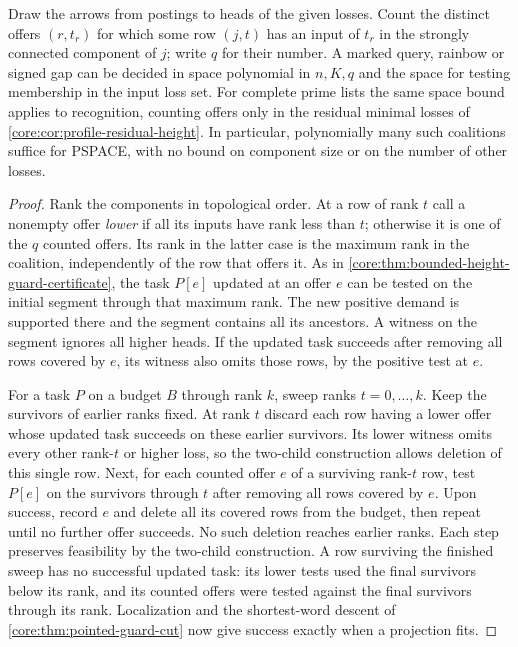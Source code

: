 \begin{theorem}
\label{core:thm:cyclic-coalition-space}
Draw the arrows from postings to heads of the given losses. Count
the distinct offers $(r,t_r)$ for which some row $(j,t)$ has an
input of $t_r$ in the strongly connected component of $j$; write
$q$ for their number. A marked query, rainbow or signed gap can be
decided in space polynomial in $n,K,q$ and the space for testing
membership in the input loss set. For complete prime lists the same
space bound applies to recognition, counting offers only in the
residual minimal losses of \cref{core:cor:profile-residual-height}.
In particular, polynomially many such coalitions suffice for PSPACE,
with no bound on component size or on the number of other losses.
\end{theorem}
\begin{proof}
Rank the components in topological order. At a row of rank $t$ call
a nonempty offer \emph{lower} if all its inputs have rank less than
$t$; otherwise it is one of the $q$ counted offers. Its rank in the
latter case is the maximum rank in the coalition, independently of
the row that offers it. As in
\cref{core:thm:bounded-height-guard-certificate}, the task $P[e]$
updated at an offer $e$ can be tested on the initial segment through
that maximum rank. The new positive demand is supported there and
the segment contains all its ancestors. A witness on the segment
ignores all higher heads. If the updated task succeeds after removing
all rows covered by $e$, its witness also omits those rows, by the
positive test at $e$.

For a task $P$ on a budget $B$ through rank $k$, sweep ranks
$t=0,\ldots,k$. Keep the survivors of earlier ranks fixed. At rank
$t$ discard each row having a lower offer whose updated task succeeds
on these earlier survivors. Its lower witness omits every other
rank-$t$ or higher loss, so the two-child construction allows deletion
of this single row. Next, for each counted offer $e$ of a surviving
rank-$t$ row, test $P[e]$ on the survivors through $t$ after removing
all rows covered by $e$. Upon success, record $e$ and delete all its
covered rows from the budget, then repeat until no further offer
succeeds. No such deletion reaches earlier ranks. Each step preserves
feasibility by the two-child construction. A row surviving the
finished sweep has no successful updated task: its lower tests used
the final survivors below its rank, and its counted offers were
tested against the final survivors through its rank. Localization and
the shortest-word descent of \cref{core:thm:pointed-guard-cut} now
give success exactly when a projection fits.


\end{proof}
